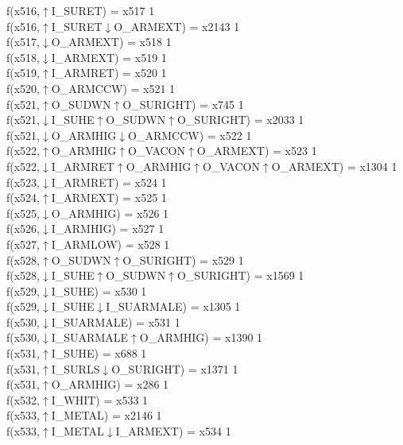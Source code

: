 f(x516,$\uparrow$I\_SURET) = x517 {1} \\
f(x516,$\uparrow$I\_SURET$\downarrow$O\_ARMEXT) = x2143 {1} \\
f(x517,$\downarrow$O\_ARMEXT) = x518 {1} \\
f(x518,$\downarrow$I\_ARMEXT) = x519 {1} \\
f(x519,$\uparrow$I\_ARMRET) = x520 {1} \\
f(x520,$\uparrow$O\_ARMCCW) = x521 {1} \\
f(x521,$\uparrow$O\_SUDWN$\uparrow$O\_SURIGHT) = x745 {1} \\
f(x521,$\downarrow$I\_SUHE$\uparrow$O\_SUDWN$\uparrow$O\_SURIGHT) = x2033 {1} \\
f(x521,$\downarrow$O\_ARMHIG$\downarrow$O\_ARMCCW) = x522 {1} \\
f(x522,$\uparrow$O\_ARMHIG$\uparrow$O\_VACON$\uparrow$O\_ARMEXT) = x523 {1} \\
f(x522,$\downarrow$I\_ARMRET$\uparrow$O\_ARMHIG$\uparrow$O\_VACON$\uparrow$O\_ARMEXT) = x1304 {1} \\
f(x523,$\downarrow$I\_ARMRET) = x524 {1} \\
f(x524,$\uparrow$I\_ARMEXT) = x525 {1} \\
f(x525,$\downarrow$O\_ARMHIG) = x526 {1} \\
f(x526,$\downarrow$I\_ARMHIG) = x527 {1} \\
f(x527,$\uparrow$I\_ARMLOW) = x528 {1} \\
f(x528,$\uparrow$O\_SUDWN$\uparrow$O\_SURIGHT) = x529 {1} \\
f(x528,$\downarrow$I\_SUHE$\uparrow$O\_SUDWN$\uparrow$O\_SURIGHT) = x1569 {1} \\
f(x529,$\downarrow$I\_SUHE) = x530 {1} \\
f(x529,$\downarrow$I\_SUHE$\downarrow$I\_SUARMALE) = x1305 {1} \\
f(x530,$\downarrow$I\_SUARMALE) = x531 {1} \\
f(x530,$\downarrow$I\_SUARMALE$\uparrow$O\_ARMHIG) = x1390 {1} \\
f(x531,$\uparrow$I\_SUHE) = x688 {1} \\
f(x531,$\uparrow$I\_SURLS$\downarrow$O\_SURIGHT) = x1371 {1} \\
f(x531,$\uparrow$O\_ARMHIG) = x286 {1} \\
f(x532,$\uparrow$I\_WHIT) = x533 {1} \\
f(x533,$\uparrow$I\_METAL) = x2146 {1} \\
f(x533,$\uparrow$I\_METAL$\downarrow$I\_ARMEXT) = x534 {1} \\
